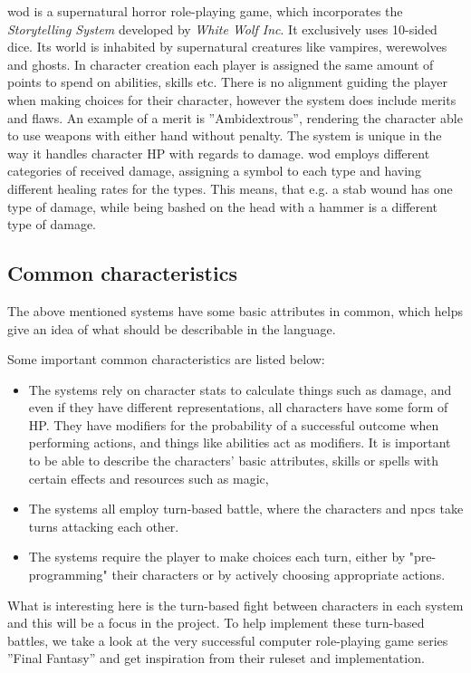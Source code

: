 \ac{wod} is a supernatural horror role-playing game, which incorporates the \emph{Storytelling System} developed by \emph{White Wolf Inc}. It exclusively uses 10-sided dice\cite{Appelcline2007}. Its world is inhabited by supernatural creatures like vampires, werewolves and ghosts. In character creation each player is assigned the same amount of points to spend on abilities, skills etc. There is no alignment guiding the player when making choices for their character, however the system does include merits and flaws. An example of a merit is ''Ambidextrous'', rendering the character able to use weapons with either hand without penalty. The system is unique in the way it handles character HP with regards to damage. \ac{wod} employs different categories of received damage, assigning a symbol to each type and having different healing rates for the types.\cite{wod} This means, that e.g. a stab wound has one type of damage, while being bashed on the head with a hammer is a different type of damage.

\subsection{Common characteristics}
\label{baseclasses}
The above mentioned systems have some basic attributes in common, which helps give an idea of what should be describable in the language.

Some important common characteristics are listed below:
\begin{itemize}
	\item The systems rely on character stats to calculate things such as damage, and even if they have different representations, all characters have some form of HP. They have modifiers for the probability of a successful outcome when performing actions, and things like abilities act as modifiers. It is important to be able to describe the characters' basic attributes, skills or spells with certain effects and resources such as magic, 
	\item The systems all employ turn-based battle, where the characters and \ac{npc}s take turns attacking each other. 
	\item The systems require the player to make choices each turn, either by "pre-programming" their characters or by actively choosing appropriate actions.
\end{itemize}

What is interesting here is the turn-based fight between characters in each system and this will be a focus in the project.
To help implement these turn-based battles, we take a look at the very successful computer role-playing game series ''Final Fantasy'' and get inspiration from their ruleset and implementation.

